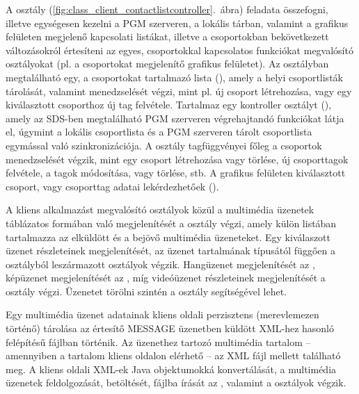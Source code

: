 A  osztály (\ref{fig:class_client_contactlistcontroller}.~ábra) feladata összefogni, illetve egységesen kezelni a PGM szerveren, a lokális tárban, valamint a grafikus felületen megjelenő kapcsolati listákat, illetve a csoportokban bekövetkezett változásokról értesíteni az egyes, csoportokkal kapcsolatos funkciókat megvalósító osztályokat (pl. a csoportokat megjelenítő grafikus felületet). Az osztályban megtalálható egy, a csoportokat tartalmazó lista (), amely a helyi csoportlisták tárolását, valamint menedzselését végzi, mint pl. új csoport létrehozása, vagy egy kiválasztott csoporthoz új tag felvétele. Tartalmaz egy kontroller osztályt (), amely az SDS-ben megtalálható PGM szerveren végrehajtandó funkciókat látja el, úgymint a lokális csoportlista és a PGM szerveren tárolt csoportlista egymással való szinkronizációja. A  osztály tagfüggvényei főleg a csoportok menedzselését végzik, mint egy csoport létrehozása vagy törlése, új csoporttagok felvétele, a tagok módosítása, vagy törlése, stb. A grafikus felületen kiválasztott csoport, vagy csoporttag adatai lekérdezhetőek ().

\medskip

A kliens alkalmazást megvalósító osztályok közül a multimédia üzenetek táblázatos formában való megjelenítését a  osztály végzi, amely külön listában tartalmazza az elküldött és a bejövő multimédia üzeneteket. Egy kiválaszott üzenet részleteinek megjelenítését, az üzenet tartalmának típusától függően a  osztályból leszármazott osztályok végzik. Hangüzenet megjelenítését az , képüzenet megjelenítését az , míg videóüzenet részleteinek megjelenítését a  osztály végzi. Üzenetet törölni szintén a  osztály segítségével lehet. 

\medskip

Egy multimédia üzenet adatainak kliens oldali perzisztens (merevlemezen történő) tárolása az értesítő MESSAGE üzenetben küldött XML-hez hasonló felépítésű fájlban történik. Az üzenethez tartozó multimédia tartalom -- amennyiben a tartalom kliens oldalon elérhető -- az XML fájl mellett található meg. A kliens oldali XML-ek Java objektumokká konvertálását, a multimédia üzenetek feldolgozását, betöltését, fájlba írását az , valamint a  osztályok végzik.


